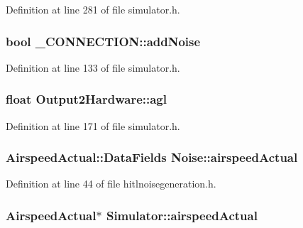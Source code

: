\-Definition at line 281 of file simulator.\-h.

\hypertarget{group___h_i_t_l_plugin_ga0d3c230504eb051a77593129ea6cd79f}{
\subsubsection[{add\-Noise}]{\setlength{\rightskip}{0pt plus 5cm}bool {\bf \-\_\-\-C\-O\-N\-N\-E\-C\-T\-I\-O\-N\-::add\-Noise}}}\label{group___h_i_t_l_plugin_ga0d3c230504eb051a77593129ea6cd79f}


\-Definition at line 133 of file simulator.\-h.

\hypertarget{group___h_i_t_l_plugin_ga40e8c62b6079618b6541408ce3dafe0c}{
\subsubsection[{agl}]{\setlength{\rightskip}{0pt plus 5cm}float {\bf \-Output2\-Hardware\-::agl}}}\label{group___h_i_t_l_plugin_ga40e8c62b6079618b6541408ce3dafe0c}


\-Definition at line 171 of file simulator.\-h.

\hypertarget{group___h_i_t_l_plugin_ga6481423a6f6cc57475e660281ba3d77d}{
\subsubsection[{airspeed\-Actual}]{\setlength{\rightskip}{0pt plus 5cm}\-Airspeed\-Actual\-::\-Data\-Fields {\bf \-Noise\-::airspeed\-Actual}}}\label{group___h_i_t_l_plugin_ga6481423a6f6cc57475e660281ba3d77d}


\-Definition at line 44 of file hitlnoisegeneration.\-h.

\hypertarget{group___h_i_t_l_plugin_gadba0d3a66c5a15e0027b7d95fc9498b4}{
\subsubsection[{airspeed\-Actual}]{\setlength{\rightskip}{0pt plus 5cm}\-Airspeed\-Actual$\ast$ {\bf \-Simulator\-::airspeed\-Actual}}}\label{group___h_i_t_l_plugin_gadba0d3a66c5a15e0027b7d95fc9498b4}


